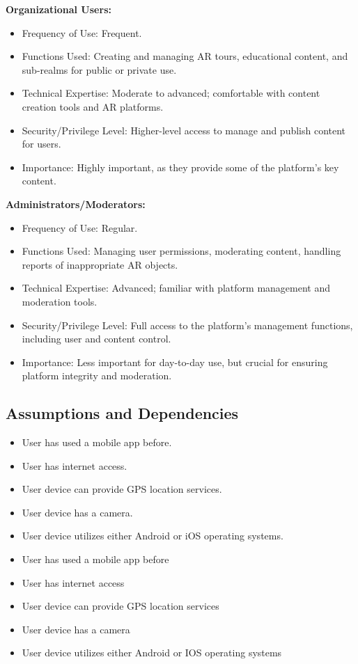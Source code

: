 \documentclass{article}
\begin{document}
\textbf{Organizational Users:}
\begin{itemize}
    \item Frequency of Use: Frequent.
    \item Functions Used: Creating and managing AR tours, educational content, and sub-realms for public or private use.
    \item Technical Expertise: Moderate to advanced; comfortable with content creation tools and AR platforms.
    \item Security/Privilege Level: Higher-level access to manage and publish content for users.
    \item Importance: Highly important, as they provide some of the platform’s key content.
\end{itemize}

\textbf{Administrators/Moderators:}
\begin{itemize}
    \item Frequency of Use: Regular.
    \item Functions Used: Managing user permissions, moderating content, handling reports of inappropriate AR objects.
    \item Technical Expertise: Advanced; familiar with platform management and moderation tools.
    \item Security/Privilege Level: Full access to the platform's management functions, including user and content control.
    \item Importance: Less important for day-to-day use, but crucial for ensuring platform integrity and moderation.
\end{itemize}

\subsection{Assumptions and Dependencies}

\begin{itemize}
    \item User has used a mobile app before.
    \item User has internet access.
    \item User device can provide GPS location services.
    \item User device has a camera.
    \item User device utilizes either Android or iOS operating systems.
\end{itemize}

\begin{itemize}
    \item User has used a mobile app before
    \item User has internet access
    \item User device can provide GPS location services
    \item User device has a camera
    \item User device utilizes either Android or IOS operating systems
\end{itemize}
\end{document}
